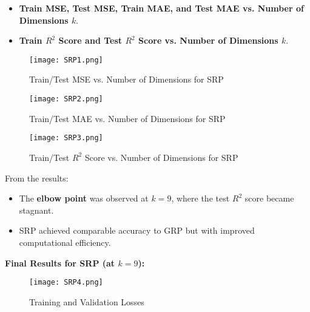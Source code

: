 \documentclass[conference]{IEEEtran}
\begin{document}
\begin{itemize}
    \item \textbf{Train MSE, Test MSE, Train MAE, and Test MAE vs. Number of Dimensions \(k\)}.
    \item \textbf{Train \(R^2\) Score and Test \(R^2\) Score vs. Number of Dimensions \(k\)}.
\end{itemize}
\vspace{-0.3cm}
\begin{figure}[H]
    \centering
    \texttt{[image: SRP1.png]}
    \caption{Train/Test MSE vs. Number of Dimensions for SRP}
    \label{fig:srp_mse_mae}
\end{figure}
\vspace{-0.3cm}
\begin{figure}[H]
    \centering
    \texttt{[image: SRP2.png]}
    \caption{Train/Test MAE vs. Number of Dimensions for SRP}
    \label{fig:srp_mse_mae}
\end{figure}
\vspace{-0.3cm}
\begin{figure}[H]
    \centering
    \texttt{[image: SRP3.png]}
    \caption{Train/Test \(R^2\) Score vs. Number of Dimensions for SRP}
    \label{fig:srp_r2}
\end{figure}
\vspace{-0.3cm}
From the results:
\begin{itemize}
    \item The \textbf{elbow point} was observed at \(k = 9\), where the test \(R^2\) score became stagnant.
    \item SRP achieved comparable accuracy to GRP but with improved computational efficiency.
\end{itemize}

\textbf{Final Results for SRP (at \(k = 9\)):}
\vspace{-0.3cm}
\begin{figure}[H]
\centering
\captionsetup{labelformat=empty}
\texttt{[image: SRP4.png]}
\caption{Training and Validation Losses}
\label{fig:train_val_losses}
\end{figure}
\vspace{-0.3cm}
\end{document}
